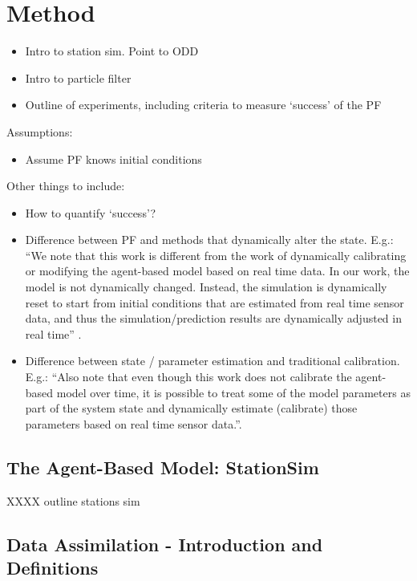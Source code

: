 \section{Method\label{Method}}

\begin{itemize}
\item Intro to station sim. Point to ODD
\item Intro to particle filter
\item Outline of experiments, including criteria to measure `success' of the PF
\end{itemize}

Assumptions:

\begin{itemize}
\item Assume PF knows initial conditions
\end{itemize}

Other things to include: 
\begin{itemize}
\item How to quantify `success'?
\item Difference between PF and methods that dynamically alter the state. E.g.: ``We note that this work is different from the work of dynamically calibrating or modifying the agent-based model based on real time data. In our work, the model is not dynamically changed. Instead, the simulation is dynamically reset to start from initial conditions that are estimated from real time sensor data, and thus the simulation/prediction results are dynamically adjusted in real time'' \citep{wang_data_2015}.
\item Difference between state / parameter estimation and traditional calibration. E.g.: ``Also note that even though this work does not calibrate the agent-based model over time, it is possible to treat some of the model parameters as part of the system state and dynamically estimate (calibrate) those parameters based on real time sensor data.''\citep{wang_data_2015}.

\end{itemize}


\subsection{The Agent-Based Model: StationSim}

XXXX outline stations sim


\subsection{Data Assimilation - Introduction and Definitions}

